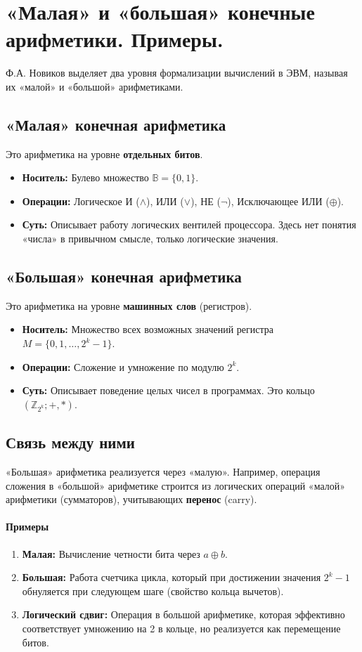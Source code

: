 \section{«Малая» и «большая» конечные арифметики. Примеры.}

Ф.А. Новиков выделяет два уровня формализации вычислений в ЭВМ, называя их «малой» и «большой» арифметиками.

\subsection*{«Малая» конечная арифметика}
Это арифметика на уровне \textbf{отдельных битов}.
\begin{itemize}
    \item \textbf{Носитель:} Булево множество $\mathbb{B} = \{0, 1\}$.
    \item \textbf{Операции:} Логическое И ($\land$), ИЛИ ($\lor$), НЕ ($\neg$), Исключающее ИЛИ ($\oplus$).
    \item \textbf{Суть:} Описывает работу логических вентилей процессора. Здесь нет понятия «числа» в привычном смысле, только логические значения.
\end{itemize}

\subsection*{«Большая» конечная арифметика}
Это арифметика на уровне \textbf{машинных слов} (регистров).
\begin{itemize}
    \item \textbf{Носитель:} Множество всех возможных значений регистра $M = \{0, 1, \dots, 2^k-1\}$.
    \item \textbf{Операции:} Сложение и умножение по модулю $2^k$.
    \item \textbf{Суть:} Описывает поведение целых чисел в программах. Это кольцо $(\mathbb{Z}_{2^k}; +, \ast)$. 
\end{itemize}

\subsection*{Связь между ними}
«Большая» арифметика реализуется через «малую». Например, операция сложения в «большой» арифметике строится из логических операций «малой» арифметики (сумматоров), учитывающих \textbf{перенос} (carry).

\paragraph{Примеры}
\begin{enumerate}
    \item \textbf{Малая:} Вычисление четности бита через $a \oplus b$.
    \item \textbf{Большая:} Работа счетчика цикла, который при достижении значения $2^k-1$ обнуляется при следующем шаге (свойство кольца вычетов).
    \item \textbf{Логический сдвиг:} Операция в большой арифметике, которая эффективно соответствует умножению на 2 в кольце, но реализуется как перемещение битов.
\end{enumerate}